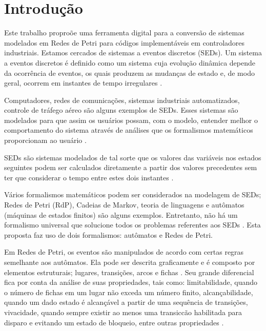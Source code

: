 \chapter{Introdu\c{c}\~ao}




Este trabalho propro\~oe uma ferramenta digital para a convers\~ao de sistemas modelados em Redes de Petri para códigos implementáveis em controladores industriais.
Estamos cercados de sistemas a eventos discretos (SEDs). Um sistema a eventos discretos \'e definido como um sistema cuja evolu\c{c}\~ao din\^amica depende da ocorr\^encia de eventos, os quais produzem as mudan\c{c}as de estado e, de modo geral, ocorrem em instantes de tempo irregulares \cite{Montgomery2004}. 

Computadores, redes de comunica\c{c}\~oes, sistemas industriais automatizados, controle de tr\'afego a\'ereo s\~ao alguns exemplos de SEDs. Esses sistemas s\~ao modelados para que assim os usu\'arios possam, com o modelo, entender melhor o comportamento do sistema atrav\'es de an\'alises que os formalismos matem\'aticos proporcionam ao usu\'ario \cite{Wolfgang2013}.

SEDs s\~ao sistemas modelados de tal sorte que os valores das vari\'aveis nos estados seguintes podem ser calculados diretamente a partir dos valores precedentes sem ter que considerar o tempo entre estes dois instantes \cite{Janette}.

V\'arios formalismos matem\'aticos podem ser considerados na modelagem de SEDs; Redes de Petri (RdP), Cadeias de Markov, teoria de linguagens e aut\^omatos (m\'aquinas de estados finitos) s\~ao alguns exemplos. Entretanto, n\~ao h\'a um formalismo universal que solucione todos os problemas referentes aos SEDs \cite{Montgomery2004}. Esta proposta faz uso de dois formalismos: aut\^omatos e Redes de Petri.



Em Redes de Petri, os eventos s\~ao manipulados de acordo com certas regras semelhante aos aut\^omatos. Ela pode ser descrita graficamente e \'e composto por elementos estruturais; lugares, transi\c{c}\~oes, arcos e fichas \cite{Cassandras2008}. Seu grande diferencial fica por conta da an\'alise de suas propriedades, tais como: limitabilidade, quando o n\'umero de fichas em um lugar n\~ao exceda um n\'umero finito, alcan\c{c}abilidade, quando um dado estado \'e alcan\c{c}\'avel a partir de uma sequ\^encia de transi\c{c}\~oes, vivacidade, quando sempre existir ao menos uma transic{c}\~ao habilitada para disparo e evitando um estado de bloqueio, entre outras propriedades \cite{Cassandras2008}.

